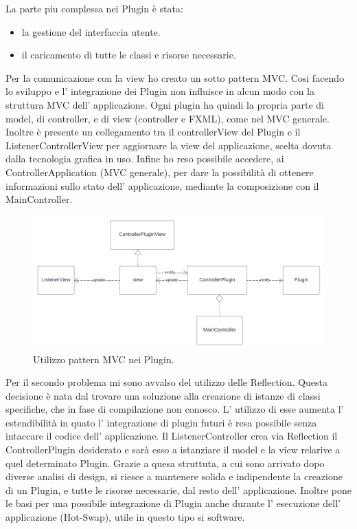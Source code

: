 \documentclass[a4paper,12pt]{report}
\begin{document}
%
La parte piu complessa nei Plugin è stata:
\begin{itemize}
	\item la gestione del interfaccia utente.
	\item il caricamento di tutte le classi e risorse necessarie.
\end{itemize}
Per la comunicazione con la view ho creato un sotto pattern MVC. Cosi facendo lo sviluppo e l' integrazione dei Plugin non influisce in alcun modo con
la struttura MVC dell' applicazione. Ogni plugin ha quindi la propria parte di model, di controller, e di view (controller e FXML), come nel MVC generale. Inoltre è presente un collegamento tra il controllerView del Plugin e il ListenerControllerView per aggiornare la view del applicazione, scelta dovuta dalla tecnologia grafica in uso. Infine ho reso possibile accedere, ai ControllerApplication (MVC generale), per dare la possibilità di ottenere informazioni sullo stato dell' applicazione, mediante la composizione con il MainController.
\begin{figure}[H]
\centering{}
\includegraphics[width=\textwidth]{img/listener/PluginMVC.png}
\caption{Utilizzo pattern MVC nei Plugin.}
\label{img:Listener}
\end{figure}
%
Per il secondo problema mi sono avvalso del utilizzo delle Reflection. Questa decisione è nata dal trovare una soluzione alla creazione di istanze di classi specifiche, che in fase di compilazione non conosco. L' utilizzo di esse aumenta l' estendibilità in quato l' integrazione di plugin futuri è resa possibile senza intaccare il codice dell' applicazione. Il ListenerController crea via Reflection il ControllerPlugin desiderato e sarà esso a istanziare il model e la view relarive a quel determinato Plugin. Grazie a quesa struttuta, a cui sono arrivato dopo diverse analisi di design, si riesce a mantenere solida e indipendente la creazione di un Plugin, e tutte le risorse necessarie, dal resto dell' applicazione. Inoltre pone le basi per una possibile integrazione di Plugin anche durante l' esecuzione dell' applicazione (Hot-Swap), utile in questo tipo si software.
\end{document}
